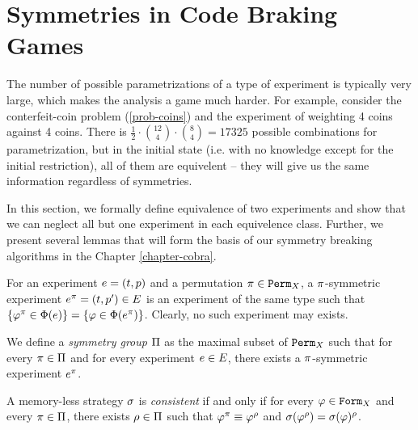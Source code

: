 \section{Symmetries in Code Braking Games}

The number of possible parametrizations of a type of experiment is typically very large,
  which makes the analysis a game much harder.
For example, consider the conterfeit-coin problem (\ref{prob-coins})
  and the experiment of weighting 4 coins against 4 coins.
There is $\frac{1}{2}\cdot {12 \choose 4}\cdot{8 \choose 4} = 17325$
 possible combinations for parametrization, but
 in the initial state (i.e. with no knowledge except for the initial restriction),
 all of them are equivelent -- they will give us the same information regardless of symmetries.

In this section, we formally define equivalence of two experiments
 and show that we can neglect all but one experiment in each equivelence class.
Further, we present several lemmas that will form the basis of
 our symmetry breaking algorithms in the Chapter \ref{chapter-cobra}.

\begin{definition}
For an experiment $e = (t, p)$ and a permutation $\pi\in\mathtt{Perm}_X$,
  a $\pi$-symmetric experiment $e^\pi = (t, p')\in E$
  is an experiment of the same type such that
  $\{\varphi^\pi \in\Phi(e)\} = \{\varphi\in\Phi(e^\pi)\}$.
Clearly, no such experiment may exists.
\end{definition}

\begin{definition}
We define a \emph{symmetry group} $\Pi$ as
  the maximal subset of $\mathtt{Perm}_X$ such that for
  every $\pi\in\Pi$ and for every experiment $e\in E$,
  there exists a $\pi$-symmetric experiment $e^\pi$.
\end{definition}

\begin{definition}
A memory-less strategy $\sigma$ is \emph{consistent} if and only if
  for every $\varphi\in\mathtt{Form}_X$ and every $\pi\in\Pi$, there
  exists $\rho\in\Pi$ such that $\varphi^\pi \equiv \varphi^\rho$ and
  $\sigma(\varphi^\rho) = \sigma(\varphi)^\rho$.
\end{definition}


